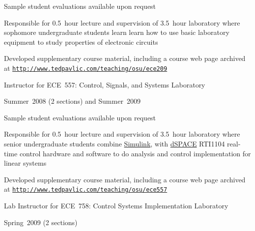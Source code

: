 \documentclass[10pt]{article}
\newenvironment{outerlist}[1][\enskip\textbullet]%
        {\begin{itemize}[#1]}{\end{itemize}%
         \vspace{-.6\baselineskip}}
\newenvironment{innerlist}[1][\enskip\textbullet]%
        {\begin{compactitem}[#1]}{\end{compactitem}}
\newcommand{\halfblankline}{\quad\vspace{-0.5\baselineskip}\pagebreak[3]}
\providecommand*\url[1]{\href{#1}{#1}}
\renewcommand*\url[1]{\href{#1}{\texttt{#1}}}
\begin{document}
\begin{outerlist}
\begin{innerlist}
\begin{innerlist}
            \item Sample student evaluations available upon request

            \item Responsible for 0.5~hour lecture and supervision of
                3.5~hour laboratory where sophomore undergraduate
                students learn learn how to use basic laboratory
                equipment to study properties of electronic circuits

            \item Developed supplementary course
                material, including a course web page archived at
                \url{http://www.tedpavlic.com/teaching/osu/ece209}
        \end{innerlist}

        \halfblankline

        \item Instructor for ECE~557: Control, Signals, and Systems
            Laboratory
        \begin{innerlist}
            \item Summer~2008 (2 sections) and Summer~2009

            \item Sample student evaluations available upon request

            \item Responsible for 0.5~hour lecture and supervision of
                3.5~hour laboratory where senior undergraduate students
                combine
                \href{http://www.mathworks.com/products/simulink/}{Simulink},
                with \href{http://www.dspaceinc.com/}{dSPACE} RTI1104
                real-time control hardware and software to do analysis
                and control implementation for linear systems

            \item Developed supplementary course
                material, including a course web page archived at
                \url{http://www.tedpavlic.com/teaching/osu/ece557}
        \end{innerlist}

        \halfblankline

        \item Lab Instructor for ECE~758: Control Systems Implementation
            Laboratory
        \begin{innerlist}
            \item Spring~2009 (2 sections)


\end{innerlist}
\end{innerlist}
\end{outerlist}
\end{document}
